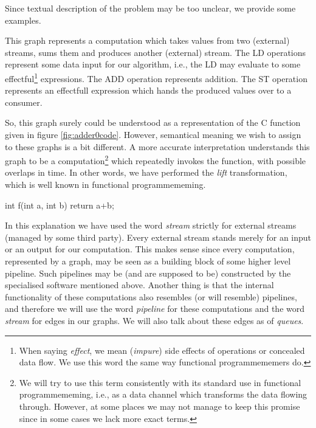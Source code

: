 Since textual description of the problem may be too unclear, we provide some examples.


This graph represents a computation which takes values from two (external) streams, sums them and produces another (external) stream. The LD operations represent some data input for our algorithm, i.e., the LD may evaluate to some effectful\footnote{When saying \emph{effect}, we mean (\emph{impure}) side effects of operations or concealed data flow. We use this word the same way functional programmememers do.} expressions. The ADD operation represents addition. The ST operation represents an effectfull expression which hands the produced values over to a consumer. 


So, this graph surely could be understood as a representation of the C function given in figure \ref{fig:adder0code}. However, semantical meaning we wish to assign to these graphs is a bit different. A more accurate interpretation understands this graph to be a computation\footnote{We will try to use this term consistently with its standard use in functional programmememing, i.e., as a data channel which transforms the data flowing through. However, at some places we may not manage to keep this promise since in some cases we lack more exact terms.} which repeatedly invokes the function, with possible overlaps in time. In other words, we have performed the \emph{lift} transformation, which is well known in functional programmememing.

\mybeginfig
\begin{code}
int f(int a, int b)
{
  return a+b;
}
\end{code}

In this explanation we have used the word \emph{stream} strictly for external streams (managed by some third party). Every external stream stands merely for an input or an output for our computation. This makes sense since every computation, represented by a graph, may be seen as a building block of some higher level pipeline. Such pipelines may be (and are supposed to be) constructed by the specialised software mentioned above. Another thing is that the internal functionality of these computations also resembles (or will resemble) pipelines, and therefore we will use the word \emph{pipeline} for these computations and the word \emph{stream} for edges in our graphs. We will also talk about these edges as of \emph{queues}. 


